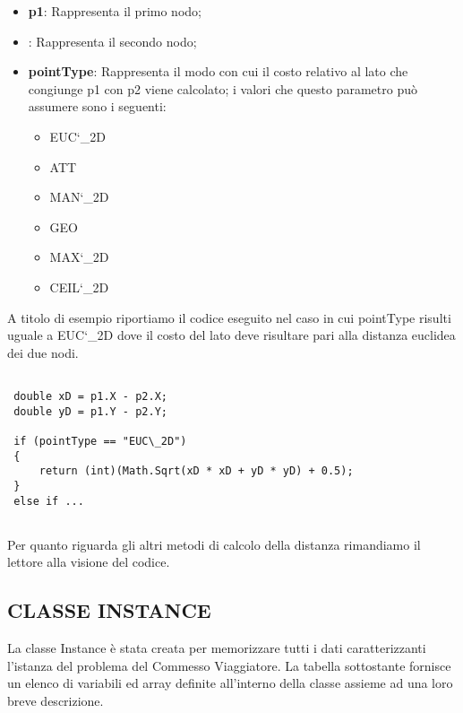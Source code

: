 \documentclass[11pt]{article}
\begin{document}
\begin{itemize}
\item \textbf{p1}: Rappresenta il primo nodo;
\item {}: Rappresenta il secondo nodo;
\item \textbf{pointType}: Rappresenta il modo con cui il costo relativo al lato che congiunge p1 con p2 viene calcolato; i valori che questo parametro può assumere sono i seguenti:
    \begin{itemize}
    \item EUC\char`\_2D
    \item ATT
    \item MAN\char`\_2D
    \item GEO
    \item MAX\char`\_2D    
    \item CEIL\char`\_2D
    \end{itemize}
\end{itemize}

A titolo di esempio riportiamo il codice eseguito nel caso in cui pointType risulti uguale a EUC\char`\_2D dove il costo del lato deve risultare pari alla distanza euclidea dei due nodi. 

\begin{lstlisting}

 double xD = p1.X - p2.X;
 double yD = p1.Y - p2.Y;
 
 if (pointType == "EUC\_2D")
 {
     return (int)(Math.Sqrt(xD * xD + yD * yD) + 0.5);
 }
 else if ...
            
\end{lstlisting}

Per quanto riguarda gli altri metodi di calcolo della distanza rimandiamo il lettore alla visione del codice.

\subsection*{CLASSE INSTANCE}
\label{sec:ClasseInstanceS}

La classe Instance è stata creata per memorizzare tutti i dati caratterizzanti l'istanza del problema del Commesso Viaggiatore. La tabella sottostante fornisce un elenco di variabili ed array definite all'interno della classe assieme ad una loro breve descrizione. 
\end{document}
